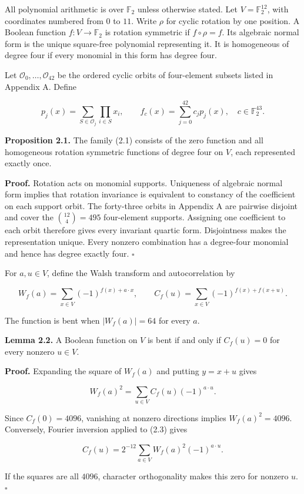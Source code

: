 \documentclass[11pt,a4paper]{article}
\begin{document}
All polynomial arithmetic is over $\mathbb F_2$ unless otherwise stated. Let $V=\mathbb F_2^{12}$, with coordinates numbered from $0$ to $11$. Write $\rho$ for cyclic rotation by one position. A Boolean function $f:V\to\mathbb F_2$ is rotation symmetric if $f\circ\rho=f$. Its algebraic normal form is the unique square-free polynomial representing it. It is homogeneous of degree four if every monomial in this form has degree four.

Let $\mathcal O_0,\ldots,\mathcal O_{42}$ be the ordered cyclic orbits of four-element subsets listed in Appendix A. Define

\[
p_j(x)=\sum_{S\in\mathcal O_j}\prod_{i\in S}x_i,
\qquad f_c(x)=\sum_{j=0}^{42}c_jp_j(x),\quad c\in\mathbb F_2^{43}. \tag{2.1}
\]

\textbf{Proposition 2.1.} The family (2.1) consists of the zero function and all homogeneous rotation symmetric functions of degree four on $V$, each represented exactly once.

\textbf{Proof.} Rotation acts on monomial supports. Uniqueness of algebraic normal form implies that rotation invariance is equivalent to constancy of the coefficient on each support orbit. The forty-three orbits in Appendix A are pairwise disjoint and cover the $\binom{12}{4}=495$ four-element supports. Assigning one coefficient to each orbit therefore gives every invariant quartic form. Disjointness makes the representation unique. Every nonzero combination has a degree-four monomial and hence has degree exactly four. \hfill$\square$

For $a,u\in V$, define the Walsh transform and autocorrelation by

\[
W_f(a)=\sum_{x\in V}(-1)^{f(x)+a\cdot x},\qquad
C_f(u)=\sum_{x\in V}(-1)^{f(x)+f(x+u)}. \tag{2.2}
\]

The function is bent when $|W_f(a)|=64$ for every $a$.

\textbf{Lemma 2.2.} A Boolean function on $V$ is bent if and only if $C_f(u)=0$ for every nonzero $u\in V$.

\textbf{Proof.} Expanding the square of $W_f(a)$ and putting $y=x+u$ gives

\[
W_f(a)^2=\sum_{u\in V}C_f(u)(-1)^{a\cdot u}. \tag{2.3}
\]

Since $C_f(0)=4096$, vanishing at nonzero directions implies $W_f(a)^2=4096$. Conversely, Fourier inversion applied to (2.3) gives

\[
C_f(u)=2^{-12}\sum_{a\in V}W_f(a)^2(-1)^{a\cdot u}.
\]

If the squares are all $4096$, character orthogonality makes this zero for nonzero $u$. \hfill$\square$
\end{document}
